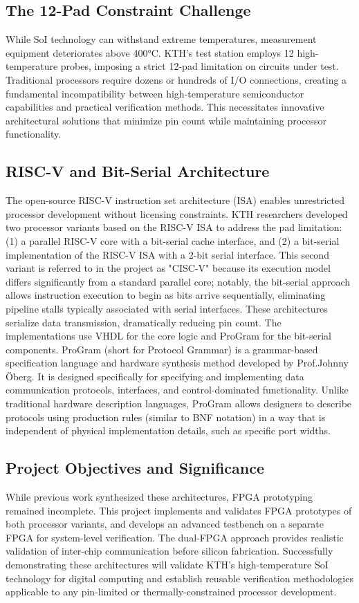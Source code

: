 \documentclass[10pt,twocolumn]{article}
\begin{document}
\subsection{The 12-Pad Constraint Challenge}
While SoI technology can withstand extreme temperatures, measurement equipment deteriorates above 400°C. KTH's test station employs 12 high-temperature probes, imposing a strict 12-pad limitation on circuits under test. Traditional processors require dozens or hundreds of I/O connections, creating a fundamental incompatibility between high-temperature semiconductor capabilities and practical verification methods. This necessitates innovative architectural solutions that minimize pin count while maintaining processor functionality.
\subsection{RISC-V and Bit-Serial Architecture}
The open-source RISC-V instruction set architecture (ISA) enables unrestricted processor development without licensing constraints. KTH researchers developed two processor variants based on the RISC-V ISA to address the pad limitation: (1) a parallel RISC-V core with a bit-serial cache interface, and (2) a bit-serial implementation of the RISC-V ISA with a 2-bit serial interface.
This second variant is referred to in the project as "CISC-V" because its execution model differs significantly from a standard parallel core; notably, the bit-serial approach allows instruction execution to begin as bits arrive sequentially, eliminating pipeline stalls typically associated with serial interfaces. These architectures serialize data transmission, dramatically reducing pin count. The implementations use VHDL for the core logic and ProGram for the bit-serial components. ProGram (short for Protocol Grammar) is a grammar-based specification language and hardware synthesis method developed by Prof.Johnny Öberg. It is designed specifically for specifying and implementing data communication protocols, interfaces, and control-dominated functionality. Unlike traditional hardware description languages, ProGram allows designers to describe protocols using production rules (similar to BNF notation) in a way that is independent of physical implementation details, such as specific port widths.
\subsection{Project Objectives and Significance}
While previous work synthesized these architectures, FPGA prototyping remained incomplete. This project implements and validates FPGA prototypes of both processor variants, and develops an advanced testbench on a separate FPGA for system-level verification. The dual-FPGA approach provides realistic validation of inter-chip communication before silicon fabrication. Successfully demonstrating these architectures will validate KTH's high-temperature SoI technology for digital computing and establish reusable verification methodologies applicable to any pin-limited or thermally-constrained processor development.
\end{document}
